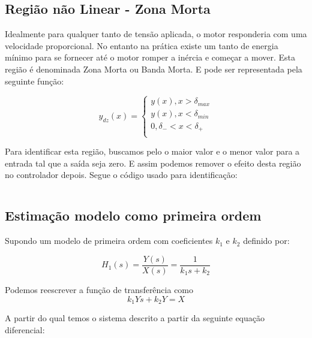 \documentclass[a4paper,11pt]{article}
\begin{document}
\subsection{Região não Linear - Zona Morta}

Idealmente para qualquer tanto de tensão aplicada, o motor responderia com uma velocidade proporcional. No entanto na prática existe um tanto de energia mínimo para se fornecer até o motor romper a inércia e começar a mover. Esta região é denominada Zona Morta ou Banda Morta. E pode ser representada pela seguinte função:

\begin{equation}
    y_{dz}(x) = 
    \left\{\begin{array}{c}
    y(x), x > \delta_{max} \\
    y(x), x < \delta_{min} \\
    0, \delta_{-} < x < \delta_{+} \\
\end{array} \right.
\end{equation}

Para identificar esta região, buscamos pelo o maior valor e o menor valor para a entrada tal que a saída seja zero. E assim podemos remover o efeito desta região no controlador depois. Segue o código usado para identificação:

\inputminted[frame=single,framesep=10pt]{matlab}{../src/matlab/deadzoneindetify.m}



\subsection{Estimação modelo como primeira ordem}

Supondo um modelo de primeira ordem com coeficientes $k_1$ e $k_2$ definido por:

\begin{equation}\label{eq:firstordertf}
    H_1(s) = \frac{Y(s)}{X(s)} = \frac{1}{k_1 s+ k_2}
\end{equation}


Podemos reescrever a função de transferência como
\begin{equation}
k_1 Ys + k_2 Y  = X
\end{equation}

A partir do qual temos o sistema descrito a partir da seguinte equação diferencial:
\end{document}
